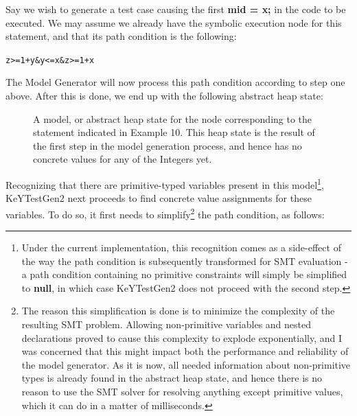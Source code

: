 \documentclass{article}
\newcommand{\tmstrong}[1]{\textbf{#1}}
\newenvironment{tmindent}{\begin{tmparmod}{1.5em}{0pt}{0pt} }{\end{tmparmod}}
\newenvironment{tmparmod}[3]{\begin{list}{}{\setlength{\topsep}{0pt}\setlength{\leftmargin}{#1}\setlength{\rightmargin}{#2}\setlength{\parindent}{#3}\setlength{\listparindent}{\parindent}\setlength{\itemindent}{\parindent}\setlength{\parsep}{\parskip}} \item[]}{\end{list}}
\newenvironment{tmparsep}[1]{\begingroup\setlength{\parskip}{#1}}{\endgroup}
\begin{document}
Say we wish to generate a test case causing the first {\tmstrong{mid = x;}} in
the code to be executed. We may assume we already have the symbolic execution
node for this statement, and that its path condition is the following:

{\noindent}\begin{tmindent}
  \begin{tmparsep}{0em}
    \begin{alltt}
z >= 1 + y & y <= x & z >= 1 + x
\end{alltt}
  \end{tmparsep}
\end{tmindent}{\hspace*{\fill}}{\medskip}

The Model Generator will now process this path condition according to step one
above. After this is done, we end up with the following abstract heap state:



\begin{tmparmod}{3cm}{0pt}{0pt}
  \begin{tmparmod}{2cm}{0pt}{0pt}
    \begin{tmparmod}{0pt}{2cm}{0pt}
      \begin{figure}[h]
        \caption{A model, or abstract heap state for the node corresponding to
        the statement indicated in Example 10. This heap state is the result
        of the first step in the model generation process, and hence has no
        concrete values for any of the Integers yet.}
      \end{figure}
    \end{tmparmod}
  \end{tmparmod}
\end{tmparmod}





Recognizing that there are primitive-typed variables present in this
model{\footnote{Under the current implementation, this recognition comes as a
side-effect of the way the path condition is subsequently transformed for SMT
evaluation - a path condition containing no primitive constraints will simply
be simplified to {\tmstrong{null}}, in which case KeYTestGen2 does not proceed
with the second step.}}, KeYTestGen2 next proceeds to find concrete value
assignments for these variables. To do so, it first needs to
simplify{\footnote{The reason this simplification is done is to minimize the
complexity of the resulting SMT problem. Allowing non-primitive variables and
nested declarations proved to cause this complexity to explode exponentially,
and I was concerned that this might impact both the performance and
reliability of the model generator. As it is now, all needed information about
non-primitive types is already found in the abstract heap state, and hence
there is no reason to use the SMT solver for resolving anything except
primitive values, which it can do in a matter of milliseconds.}} the path
condition, as follows:
\end{document}
